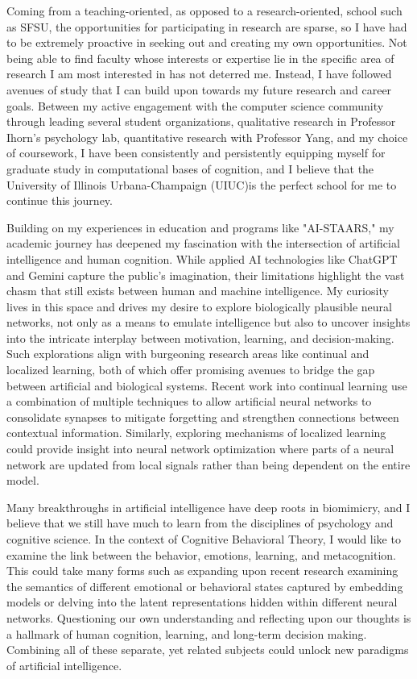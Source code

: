 \documentclass[12pt]{article}
\newcommand{\school}{University of Illinois Urbana-Champaign (UIUC)}
\begin{document}
Coming from a teaching-oriented, as opposed to a research-oriented, school such as SFSU, the opportunities for participating in research are
sparse, so I have had to be extremely proactive in seeking out and creating my own opportunities. Not being able to find faculty
whose interests or expertise lie in the specific area of research I am most interested in has not deterred me. Instead, I have followed
avenues of study that I can build upon towards my future research and career goals. Between my active engagement with the computer science
community through leading several student organizations, qualitative research in Professor Ihorn's psychology lab, quantitative research
with Professor Yang, and my choice of coursework, I have been consistently and persistently equipping myself for graduate study in
computational bases of cognition, and I believe that the \school is the perfect school for me to continue this journey.

Building on my experiences in education and programs like "AI-STAARS," my academic journey has deepened my fascination with the
intersection of artificial intelligence and human cognition. While applied AI technologies like ChatGPT and Gemini capture the public's
imagination, their limitations highlight the vast chasm that still exists between human and machine intelligence. My curiosity lives in this
space and drives my desire to explore biologically plausible neural networks, not only as a means to emulate intelligence but also to uncover
insights into the intricate interplay between motivation, learning, and decision-making. Such explorations align with burgeoning research
areas like continual and localized learning, both of which offer promising avenues to bridge the gap between artificial and biological
systems. Recent work into continual learning use a combination of multiple techniques to allow artificial neural networks to consolidate
synapses to mitigate forgetting and strengthen connections between contextual information. Similarly, exploring mechanisms of localized
learning could provide insight into neural network optimization where parts of a neural network are updated from local signals rather than
being dependent on the entire model.

Many breakthroughs in artificial intelligence have deep roots in biomimicry, and I believe that we still have much to learn from the
disciplines of psychology and cognitive science.  In the context of Cognitive Behavioral Theory, I would like to examine the link between
the behavior, emotions, learning, and metacognition. This could take many forms such as expanding upon recent research examining the
semantics of different emotional or behavioral states captured by embedding models or delving into the latent representations hidden within
different neural networks. Questioning our own understanding and reflecting upon our thoughts is a hallmark of human cognition, learning,
and long-term decision making. Combining all of these separate, yet related subjects could unlock new paradigms of artificial intelligence.
\end{document}
